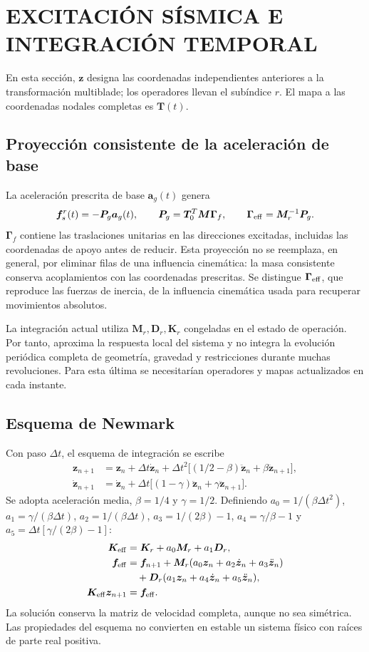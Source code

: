 \documentclass[oneside,a4paper,spanish,links,pagenumbers]{amca}
\begin{document}
\section{EXCITACIÓN SÍSMICA E INTEGRACIÓN TEMPORAL}
En esta sección, $\bm z$ designa las coordenadas independientes anteriores a la transformación multiblade; los operadores llevan el subíndice $r$. El mapa a las coordenadas nodales completas es $\bm T(t)$.
\subsection{Proyección consistente de la aceleración de base}
La aceleración prescrita de base $\bm a_g(t)$ genera
\begin{equation}
\bm f_s^r(t)=-\bm P_g\bm a_g(t),
\qquad \bm P_g=\bm T_0^T\bm M\bm\Gamma_f,
\qquad \bm\Gamma_{\rm eff}=\bm M_r^{-1}\bm P_g.
\end{equation}
$\bm\Gamma_f$ contiene las traslaciones unitarias en las direcciones excitadas, incluidas las coordenadas de apoyo antes de reducir. Esta proyección no se reemplaza, en general, por eliminar filas de una influencia cinemática: la masa consistente conserva acoplamientos con las coordenadas prescritas. Se distingue $\bm\Gamma_{\rm eff}$, que reproduce las fuerzas de inercia, de la influencia cinemática usada para recuperar movimientos absolutos.

La integración actual utiliza $\bm M_r,\bm D_r,\bm K_r$ congeladas en el estado de operación. Por tanto, aproxima la respuesta local del sistema y no integra la evolución periódica completa de geometría, gravedad y restricciones durante muchas revoluciones. Para esta última se necesitarían operadores y mapas actualizados en cada instante.

\subsection{Esquema de Newmark}
Con paso $\Delta t$, el esquema de integración \citep{newmark1971} se escribe
\begin{align}
\bm z_{n+1}&=\bm z_n+\Delta t\dot{\bm z}_n
+\Delta t^2\bigl[(1/2-\beta)\ddot{\bm z}_n+\beta\ddot{\bm z}_{n+1}\bigr],\\
\dot{\bm z}_{n+1}&=\dot{\bm z}_n
+\Delta t\bigl[(1-\gamma)\ddot{\bm z}_n+\gamma\ddot{\bm z}_{n+1}\bigr].
\end{align}
Se adopta aceleración media, $\beta=1/4$ y $\gamma=1/2$. Definiendo $a_0=1/(\beta\Delta t^2)$, $a_1=\gamma/(\beta\Delta t)$, $a_2=1/(\beta\Delta t)$, $a_3=1/(2\beta)-1$, $a_4=\gamma/\beta-1$ y $a_5=\Delta t[\gamma/(2\beta)-1]$:
\begin{align}
\bm K_{\rm eff}&=\bm K_r+a_0\bm M_r+a_1\bm D_r,\\
\bm f_{\rm eff}&=\bm f_{n+1}
+\bm M_r(a_0\bm z_n+a_2\dot{\bm z}_n+a_3\ddot{\bm z}_n)\nonumber\\
&\quad+\bm D_r(a_1\bm z_n+a_4\dot{\bm z}_n+a_5\ddot{\bm z}_n),\\
\bm K_{\rm eff}\bm z_{n+1}&=\bm f_{\rm eff}.
\end{align}
La solución conserva la matriz de velocidad completa, aunque no sea simétrica. Las propiedades del esquema no convierten en estable un sistema físico con raíces de parte real positiva.
\end{document}
